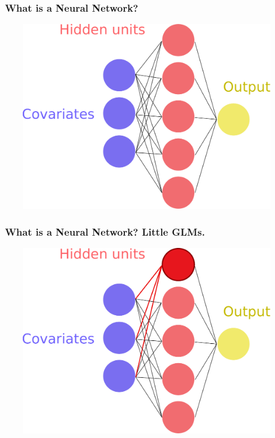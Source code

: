 \documentclass[handout, aspectratio = 169]{beamer}
\begin{document}
\begin{frame}
\frametitle{\insertframenumber~What is a Neural Network?}

\vspace{6mm}
\begin{figure}
    \includegraphics[height = 0.7\textheight]{neural_network.pdf}
\end{figure} 
\end{frame} 


\begin{frame}
\frametitle{\insertframenumber~What is a Neural Network? Little GLMs.}

\vspace{6mm}
\begin{figure}
    \includegraphics[height = 0.7\textheight]{neural_network2.pdf}
\end{figure} 
\end{frame} 
\end{document}
